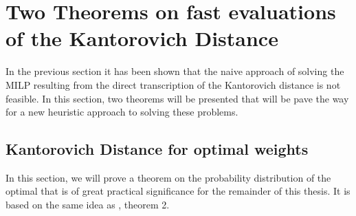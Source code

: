 \section{Two Theorems on fast evaluations of the Kantorovich Distance}
In the previous section it has been shown that the naive approach of solving the MILP resulting from the direct transcription of the Kantorovich distance is not feasible.
In this section, two theorems will be presented that will be pave the way for a new heuristic approach to solving these problems.
\subsection{Kantorovich Distance for optimal weights}
\label{sec:optimal-weights-proof}
In this section, we will prove a theorem on the probability distribution of the optimal
that is of great practical significance for the remainder of this thesis.
It is based on the same idea as \cite{Dupacova2003}, theorem 2.

